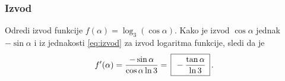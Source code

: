 \subsubsection{Izvod}

\zadatak Odredi izvod funkcije $f(\alpha)=\log_3(\cos\alpha)$.
\resenje Kako je izvod $\cos\alpha$ jednak $-\sin\alpha$ i iz jednakosti 
\eqref{eq:izvod} za izvod logaritma funkcije, sledi da je
$$
f'(\alpha)
=\frac{-\sin\alpha}{\cos\alpha\ln3}
=\ram{-\frac{\tan\alpha}{\ln3}}.
$$

